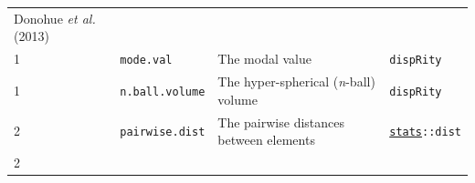 \documentclass[]{book}
\theoremstyle{definition}
\theoremstyle{definition}
\theoremstyle{remark}
\begin{document}
\begin{longtable}[]{@{}llll@{}}
\begin{minipage}[t]{0.11\columnwidth}
Donohue \emph{et al.} (2013)\strut
\end{minipage}\tabularnewline
\begin{minipage}[t]{0.08\columnwidth}\raggedright\strut
1\strut
\end{minipage} & \begin{minipage}[t]{0.08\columnwidth}\raggedright\strut
\texttt{mode.val}\strut
\end{minipage} & \begin{minipage}[t]{0.61\columnwidth}\raggedright\strut
The modal value\strut
\end{minipage} & \begin{minipage}[t]{0.11\columnwidth}\raggedright\strut
\texttt{dispRity}\strut
\end{minipage}\tabularnewline
\begin{minipage}[t]{0.08\columnwidth}\raggedright\strut
1\strut
\end{minipage} & \begin{minipage}[t]{0.08\columnwidth}\raggedright\strut
\texttt{n.ball.volume}\strut
\end{minipage} & \begin{minipage}[t]{0.61\columnwidth}\raggedright\strut
The hyper-spherical (\emph{n}-ball) volume\strut
\end{minipage} & \begin{minipage}[t]{0.11\columnwidth}\raggedright\strut
\texttt{dispRity}\strut
\end{minipage}\tabularnewline
\begin{minipage}[t]{0.08\columnwidth}\raggedright\strut
2\strut
\end{minipage} & \begin{minipage}[t]{0.08\columnwidth}\raggedright\strut
\texttt{pairwise.dist}\strut
\end{minipage} & \begin{minipage}[t]{0.61\columnwidth}\raggedright\strut
The pairwise distances between elements\strut
\end{minipage} & \begin{minipage}[t]{0.11\columnwidth}\raggedright\strut
\href{https://cran.r-project.org/web/packages/stats/index.html}{\texttt{stats}}\texttt{::dist}\strut
\end{minipage}\tabularnewline
\begin{minipage}[t]{0.08\columnwidth}\raggedright\strut
2\strut
\end{minipage} & \begin{minipage}[t]{0.08\columnwidth}\raggedright\strut

\end{minipage}
\end{longtable}
\end{document}
